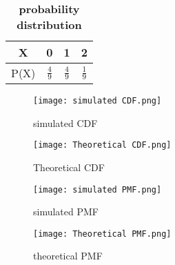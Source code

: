 \documentclass[11pt,a4paper,twocolumn]{article}
\begin{document}
\begin{table}[ht]
    \centering
    \begin{tabular}{|c|c|c|c|}
    \hline
    X&0&1&2\\[5pt]
    \hline
    P(X)&$\frac{4}{9}$&$\frac{4}{9}$&$\frac{1}{9}$\\[5pt]
    \hline
    \end{tabular}
    \caption{\textbf{probability distribution}}
\end{table}
\begin{figure}[h!]
    \centering
    \texttt{[image: simulated CDF.png]}
    \caption{simulated CDF}
\end{figure}
\begin{figure}[h!]
    \centering
    \texttt{[image: Theoretical CDF.png]} 
    \caption{Theoretical CDF}
\end{figure}
\begin{figure}[h!]
    \centering
    \texttt{[image: simulated PMF.png]} 
    \caption{simulated PMF}
\end{figure}
\begin{figure}[h!]
    \centering
    \texttt{[image: Theoretical PMF.png]}
    \caption{theoretical PMF}
\end{figure}
\end{document}
